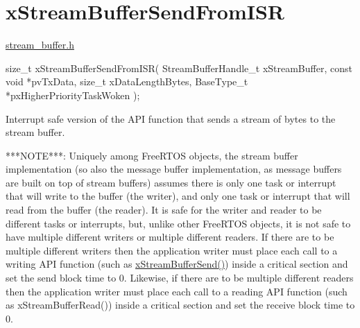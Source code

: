 \hypertarget{group__x_stream_buffer_send_from_i_s_r}{}\section{x\+Stream\+Buffer\+Send\+From\+I\+SR}
\label{group__x_stream_buffer_send_from_i_s_r}
\mbox{\hyperlink{stream__buffer_8h}{stream\+\_\+buffer.\+h}}


\begin{DoxyPre}
size\_t xStreamBufferSendFromISR( StreamBufferHandle\_t xStreamBuffer,
                                 const void *pvTxData,
                                 size\_t xDataLengthBytes,
                                 BaseType\_t *pxHigherPriorityTaskWoken );

\begin{DoxyPre}\end{DoxyPre}
\end{DoxyPre}



\begin{DoxyPre}
\begin{DoxyPre}   Interrupt safe version of the API function that sends a stream of bytes to
   the stream buffer.\end{DoxyPre}
\end{DoxyPre}



\begin{DoxyPre}
\begin{DoxyPre}   ***NOTE***:  Uniquely among FreeRTOS objects, the stream buffer
   implementation (so also the message buffer implementation, as message buffers
   are built on top of stream buffers) assumes there is only one task or
   interrupt that will write to the buffer (the writer), and only one task or
   interrupt that will read from the buffer (the reader).  It is safe for the
   writer and reader to be different tasks or interrupts, but, unlike other
   FreeRTOS objects, it is not safe to have multiple different writers or
   multiple different readers.  If there are to be multiple different writers
   then the application writer must place each call to a writing API function
   (such as \mbox{\hyperlink{stream__buffer_8h_a35cdf3b6bf677086b9128782f762499d}{xStreamBufferSend()}}) inside a critical section and set the send
   block time to 0.  Likewise, if there are to be multiple different readers
   then the application writer must place each call to a reading API function
   (such as xStreamBufferRead()) inside a critical section and set the receive
   block time to 0.\end{DoxyPre}
\end{DoxyPre}




